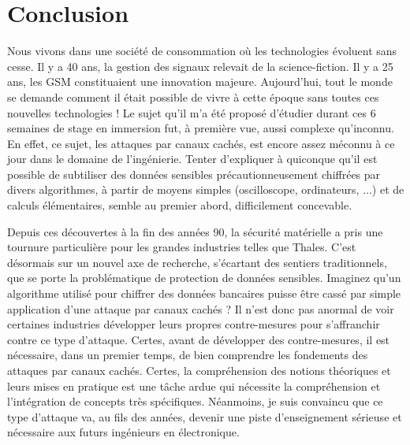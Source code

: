 \documentclass[oneside]{book}
\begin{document}
\newpage


\chapter{Conclusion}

Nous vivons dans une société de consommation où les technologies évoluent sans cesse. Il y a 40 ans, la gestion des signaux relevait de la science-fiction. Il y a 25 ans, les GSM constituaient une innovation majeure. Aujourd’hui, tout le monde se demande comment il était possible de vivre à cette époque sans toutes ces nouvelles technologies ! Le sujet qu'il m'a été proposé d'étudier durant ces 6 semaines de stage en immersion fut, à première vue, aussi complexe qu'inconnu. En effet, ce sujet, les attaques par canaux cachés, est encore assez méconnu à ce jour dans le domaine de l'ingénierie. Tenter d'expliquer à quiconque qu'il est possible de subtiliser des données sensibles précautionneusement chiffrées par divers algorithmes, à partir de moyens simples (oscilloscope, ordinateurs, ...) et de calculs élémentaires, semble au premier abord, difficilement concevable. 

Depuis ces découvertes à la fin des années 90, la sécurité matérielle a pris une tournure particulière pour les grandes industries telles que Thales. C'est désormais sur un nouvel axe de recherche, s'écartant des sentiers traditionnels, que se porte la problématique de protection de données sensibles. Imaginez qu'un algorithme utilisé pour chiffrer des données bancaires puisse être cassé par simple application d'une attaque par canaux cachés ? Il n'est donc pas anormal de voir certaines industries développer leurs propres contre-mesures pour s'affranchir contre ce type d'attaque. Certes, avant de développer des contre-mesures, il est nécessaire, dans un premier temps, de bien comprendre les fondements des attaques par canaux cachés. Certes, la compréhension des notions théoriques et leurs mises en pratique est une tâche ardue qui nécessite la compréhension et l'intégration de concepts très spécifiques. Néanmoins, je suis convaincu que ce type d'attaque va, au fils des années, devenir une piste d'enseignement sérieuse et nécessaire aux futurs ingénieurs en électronique.
\end{document}
